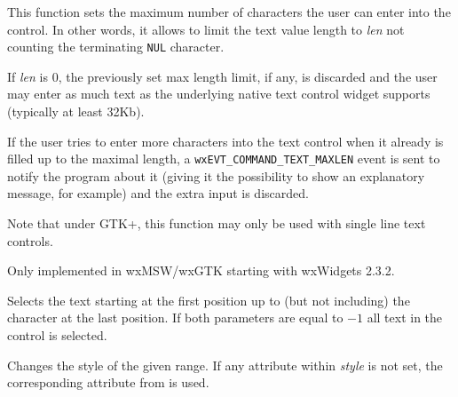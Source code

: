 \label{wxtextctrlsetmaxlength}


This function sets the maximum number of characters the user can enter into the
control. In other words, it allows to limit the text value length to {\it len}
not counting the terminating {\tt NUL} character.

If {\it len} is $0$, the previously set max length limit, if any, is discarded
and the user may enter as much text as the underlying native text control
widget supports (typically at least 32Kb).

If the user tries to enter more characters into the text control when it
already is filled up to the maximal length, a
{\tt wxEVT\_COMMAND\_TEXT\_MAXLEN} event is sent to notify the program about it
(giving it the possibility to show an explanatory message, for example) and the
extra input is discarded.

Note that under GTK+, this function may only be used with single line text controls.


Only implemented in wxMSW/wxGTK starting with wxWidgets 2.3.2.


\label{wxtextctrlsetselection}


Selects the text starting at the first position up to (but not including) the
character at the last position. If both parameters are equal to $-1$ all text
in the control is selected.





\label{wxtextctrlsetstyle}


Changes the style of the given range. If any attribute within {\it style} is
not set, the corresponding attribute from  is used.



